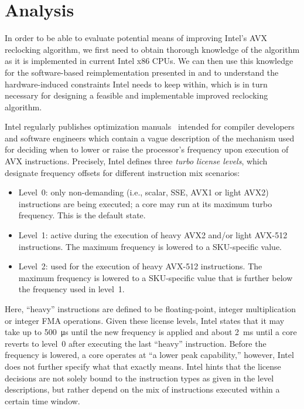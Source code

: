 \chapter{Analysis}
\label{sec:analysis}

In order to be able to evaluate potential means of improving Intel's \gls{AVX} reclocking algorithm, we first need to obtain thorough knowledge of the algorithm as it is implemented in current Intel x86 \glspl{CPU}. We can then use this knowledge for the software-based reimplementation presented in  and to understand the hardware-induced constraints Intel needs to keep within, which is in turn necessary for designing a feasible and implementable improved reclocking algorithm.

Intel regularly publishes optimization manuals~\cite{inteloptimizationmanual} intended for compiler developers and software engineers which contain a vague description of the mechanism used for deciding when to lower or raise the processor's frequency upon execution of \gls{AVX} instructions. Precisely, Intel defines three \textit{turbo license levels}, which designate frequency offsets for different instruction mix scenarios:

\begin{itemize}
	\item Level~0: only non-demanding (i.e., scalar, \gls{SSE}, \gls{AVX1} or light \gls{AVX2}) instructions are being executed; a core may run at its maximum turbo frequency. This is the default state.
	\item Level~1: active during the execution of heavy \gls{AVX2} and/or light \gls{AVX-512} instructions. The maximum frequency is lowered to a \gls{SKU}-specific value.
	\item Level~2: used for the execution of heavy \gls{AVX-512} instructions. The maximum frequency is lowered to a \gls{SKU}-specific value that is further below the frequency used in level~1.
\end{itemize}

\noindent Here, \enquote{heavy} instructions are defined to be floating-point, integer multiplication or integer \gls{FMA} operations. Given these license levels, Intel states that it may take up to \SI{500}{\micro\second} until the new frequency is applied and about \SI{2}{\milli\second} until a core reverts to level~0 after executing the last \enquote{heavy} instruction. Before the frequency is lowered, a core operates at \enquote{a lower peak capability,} however, Intel does not further specify what that exactly means. Intel hints that the license decisions are not solely bound to the instruction types as given in the level descriptions, but rather depend on the mix of instructions executed within a certain time window.

